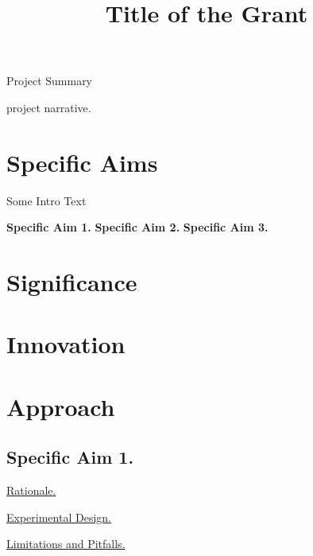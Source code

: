 \documentclass[11pt,notitlepage]{article}
\title{Title of the Grant}
\begin{document}
\fontsize{11.5}{13.8}\selectfont %
Project Summary


\newpage
project narrative.


\newpage

\section*{Specific Aims}



Some Intro Text


\textbf{Specific Aim 1. } 
\textbf{Specific Aim 2. } 
\textbf{Specific Aim 3. } 



\newpage
\section*{Significance}

\section*{Innovation}

\section*{Approach}





\subsection*{Specific Aim 1. }

\underline{Rationale.} 

\underline{Experimental Design.} 

\underline{Limitations and Pitfalls.}

\newpage
\raggedright
\end{document}
